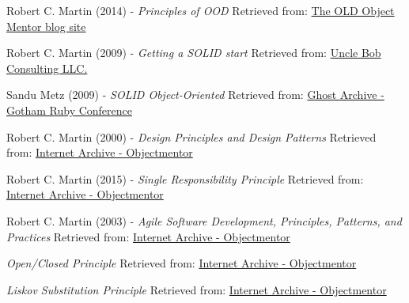 Robert C. Martin (2014) - \emph{Principles of OOD}
\newline
Retrieved from: \href{http://butunclebob.com/ArticleS.UncleBob.PrinciplesOfOod}{The OLD Object Mentor blog site}

Robert C. Martin (2009) - \emph{Getting a SOLID start}
\newline
Retrieved from: \href{https://web.archive.org/web/20130917122741/https://sites.google.com/site/unclebobconsultingllc/getting-a-solid-start}{Uncle Bob Consulting LLC.}

Sandu Metz (2009) - \emph{SOLID Object-Oriented}
\newline
Retrieved from: \href{https://ghostarchive.org/varchive/v-2yFMzxqwU}{Ghost Archive - Gotham Ruby Conference}

Robert C. Martin (2000) - \emph{Design Principles and Design Patterns}
\newline
Retrieved from: \href{https://web.archive.org/web/20150906155800/http://www.objectmentor.com/resources/articles/Principles_and_Patterns.pdf}{Internet Archive - Objectmentor}

Robert C. Martin (2015) - \emph{Single Responsibility Principle}
\newline
Retrieved from: \href{https://web.archive.org/web/20150202200348/http://www.objectmentor.com/resources/articles/srp.pdf}{Internet Archive - Objectmentor}

 Robert C. Martin (2003) - \emph{Agile Software Development, Principles, Patterns, and Practices}
\newline
Retrieved from: \href{https://web.archive.org/web/20150202200348/http://www.objectmentor.com/resources/articles/srp.pdf}{Internet Archive - Objectmentor}

 \emph{Open/Closed Principle}
\newline
Retrieved from: \href{https://web.archive.org/web/20150905081105/http://www.objectmentor.com/resources/articles/ocp.pdf}{Internet Archive - Objectmentor}

 \emph{Liskov Substitution Principle}
\newline
Retrieved from: \href{https://web.archive.org/web/20150905081111/http://www.objectmentor.com/resources/articles/lsp.pdf}{Internet Archive - Objectmentor}


